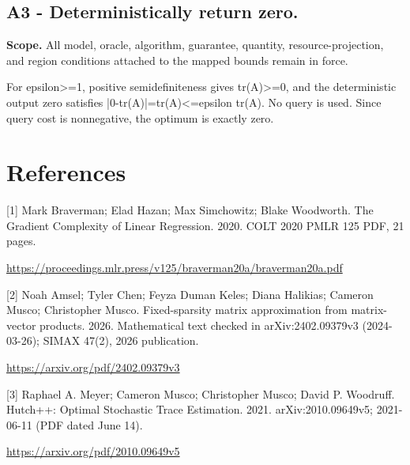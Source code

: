 \documentclass[10pt,a4paper]{article}
\begin{document}
\subsection{A3 - Deterministically return zero.}
\textbf{Scope.} All model, oracle, algorithm, guarantee, quantity, resource-projection, and region conditions attached to the mapped bounds remain in force.

For epsilon>=1, positive semidefiniteness gives tr(A)>=0, and the deterministic output zero satisfies |0-tr(A)|=tr(A)<=epsilon tr(A). No query is used. Since query cost is nonnegative, the optimum is exactly zero.

\section{References}
[1] Mark Braverman; Elad Hazan; Max Simchowitz; Blake Woodworth. The Gradient Complexity of Linear Regression. 2020. COLT 2020 PMLR 125 PDF, 21 pages.

\url{https://proceedings.mlr.press/v125/braverman20a/braverman20a.pdf}

[2] Noah Amsel; Tyler Chen; Feyza Duman Keles; Diana Halikias; Cameron Musco; Christopher Musco. Fixed-sparsity matrix approximation from matrix-vector products. 2026. Mathematical text checked in arXiv:2402.09379v3 (2024-03-26); SIMAX 47(2), 2026 publication.

\url{https://arxiv.org/pdf/2402.09379v3}

[3] Raphael A. Meyer; Cameron Musco; Christopher Musco; David P. Woodruff. Hutch++: Optimal Stochastic Trace Estimation. 2021. arXiv:2010.09649v5; 2021-06-11 (PDF dated June 14).

\url{https://arxiv.org/pdf/2010.09649v5}
\end{document}
